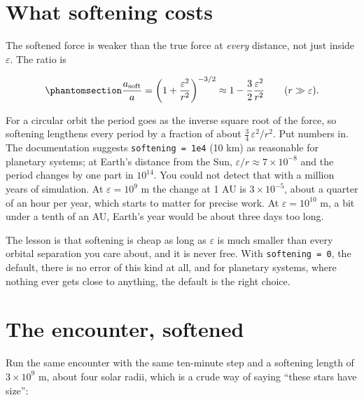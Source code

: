 \documentclass[
  10.5pt,
  letterpaper,
]{scrbook}
\theoremstyle{plain}
\theoremstyle{remark}
\begin{document}
\section{What softening costs}\label{what-softening-costs}

The softened force is weaker than the true force at \emph{every}
distance, not just inside \(\varepsilon\). The ratio is

\begin{equation}\protect\phantomsection\label{eq-softening-error}{
\frac{a_{\mathrm{soft}}}{a} = \left(1 + \frac{\varepsilon^2}{r^2}\right)^{-3/2} \approx 1 - \frac{3}{2}\frac{\varepsilon^2}{r^2}
\qquad (r \gg \varepsilon).
}\end{equation}

For a circular orbit the period goes as the inverse square root of the
force, so softening lengthens every period by a fraction of about
\(\tfrac34\,\varepsilon^2/r^2\). Put numbers in. The documentation
suggests \texttt{softening\ =\ 1e4} (10 km) as reasonable for planetary
systems; at Earth's distance from the Sun,
\(\varepsilon/r \approx 7\times10^{-8}\) and the period changes by one
part in \(10^{14}\). You could not detect that with a million years of
simulation. At \(\varepsilon = 10^9\) m the change at 1 AU is
\(3\times10^{-5}\), about a quarter of an hour per year, which starts to
matter for precise work. At \(\varepsilon = 10^{10}\) m, a bit under a
tenth of an AU, Earth's year would be about three days too long.

The lesson is that softening is cheap as long as \(\varepsilon\) is much
smaller than every orbital separation you care about, and it is never
free. With \texttt{softening\ =\ 0}, the default, there is no error of
this kind at all, and for planetary systems, where nothing ever gets
close to anything, the default is the right choice.

\section{The encounter, softened}\label{the-encounter-softened}

Run the same encounter with the same ten-minute step and a softening
length of \(3\times10^9\) m, about four solar radii, which is a crude
way of saying ``these stars have size'':
\end{document}
